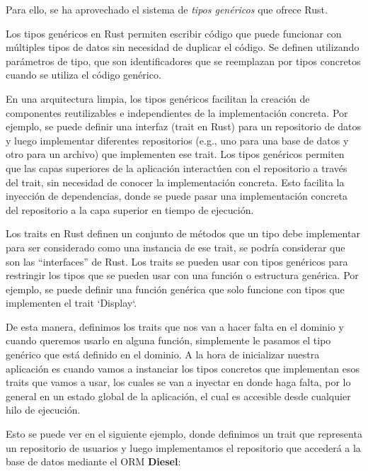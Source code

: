 Para ello, se ha aprovechado el sistema de \textit{tipos genéricos} que ofrece Rust.

Los tipos genéricos en Rust permiten escribir código que puede funcionar con múltiples tipos de datos sin necesidad de duplicar el código. Se definen utilizando parámetros de tipo, que son identificadores que se reemplazan por tipos concretos cuando se utiliza el código genérico.

En una arquitectura limpia, los tipos genéricos facilitan la creación de componentes reutilizables e independientes de la implementación concreta. Por ejemplo, se puede definir una interfaz (trait en Rust) para un repositorio de datos y luego implementar diferentes repositorios (e.g., uno para una base de datos y otro para un archivo) que implementen ese trait. Los tipos genéricos permiten que las capas superiores de la aplicación interactúen con el repositorio a través del trait, sin necesidad de conocer la implementación concreta. Esto facilita la inyección de dependencias, donde se puede pasar una implementación concreta del repositorio a la capa superior en tiempo de ejecución.

Los traits en Rust definen un conjunto de métodos que un tipo debe implementar para ser considerado como una instancia de ese trait, se podría considerar que son las ``interfaces'' de Rust. Los traits se pueden usar con tipos genéricos para restringir los tipos que se pueden usar con una función o estructura genérica. Por ejemplo, se puede definir una función genérica que solo funcione con tipos que implementen el trait `Display`.

De esta manera, definimos los traits que nos van a hacer falta en el dominio y cuando queremos usarlo en alguna función, simplemente le pasamos el tipo genérico que está definido en el dominio.
A la hora de inicializar nuestra aplicación es cuando vamos a instanciar los tipos concretos que implementan esos traits que vamos a usar, los cuales se van a inyectar en donde haga falta, por lo general en un estado global de la aplicación, el cual es accesible desde cualquier hilo de ejecución.

Esto se puede ver en el siguiente ejemplo, donde definimos un trait que representa un repositorio de usuarios y luego implementamos el repositorio que accederá a la base de datos mediante el ORM \textbf{Diesel}:


